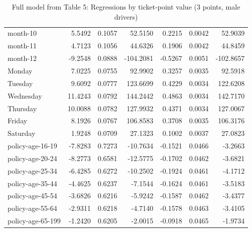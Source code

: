 \documentclass[10pt]{article}
\begin{document}
\begin{table}[ht]
\begin{tabular}{lrrrrrr}
  month-10 & 5.5492 & 0.1057 & 52.5150 & 0.2215 & 0.0042 & 52.9039 \\ 
  month-11 & 4.7123 & 0.1056 & 44.6326 & 0.1906 & 0.0042 & 44.8459 \\ 
  month-12 & -9.2548 & 0.0888 & -104.2081 & -0.5267 & 0.0051 & -102.8657 \\ 
  Monday & 7.0225 & 0.0755 & 92.9902 & 0.3257 & 0.0035 & 92.5918 \\ 
  Tuesday & 9.6092 & 0.0777 & 123.6699 & 0.4229 & 0.0034 & 122.6208 \\ 
  Wednesday & 11.4243 & 0.0792 & 144.2442 & 0.4863 & 0.0034 & 142.7170 \\ 
  Thursday & 10.0088 & 0.0782 & 127.9932 & 0.4371 & 0.0034 & 127.0067 \\ 
  Friday & 8.1926 & 0.0767 & 106.8583 & 0.3708 & 0.0035 & 106.3176 \\ 
  Saturday & 1.9248 & 0.0709 & 27.1323 & 0.1002 & 0.0037 & 27.0823 \\ 
  policy-age-16-19 & -7.8283 & 0.7273 & -10.7634 & -0.1521 & 0.0466 & -3.2663 \\ 
  policy-age-20-24 & -8.2773 & 0.6581 & -12.5775 & -0.1702 & 0.0462 & -3.6821 \\ 
  policy-age-25-34 & -6.4285 & 0.6272 & -10.2502 & -0.1924 & 0.0461 & -4.1712 \\ 
  policy-age-35-44 & -4.4625 & 0.6237 & -7.1544 & -0.1624 & 0.0461 & -3.5183 \\ 
  policy-age-45-54 & -3.6826 & 0.6216 & -5.9242 & -0.1587 & 0.0462 & -3.4377 \\ 
  policy-age-55-64 & -2.9311 & 0.6218 & -4.7140 & -0.1578 & 0.0463 & -3.4105 \\ 
  policy-age-65-199 & -1.2420 & 0.6205 & -2.0015 & -0.0918 & 0.0465 & -1.9734 \\ 
   \hline
\end{tabular}
\caption{Full model from Table 5: Regressions by ticket-point value (3 points, male drivers)} 
\label{tab_5_3_pts_M}
\end{table}


\clearpage
\pagebreak



\end{document}
